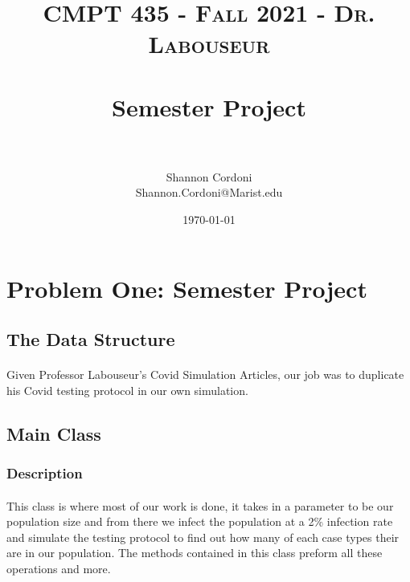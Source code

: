 \documentclass[letterpaper, 10pt,DIV=13]{scrartcl}
\title{	
   \normalfont \normalsize 
   \textsc{CMPT 435 - Fall 2021 - Dr. Labouseur} \\[10pt] %
   \horrule{0.5pt} \\[0.25cm] 	%
   \huge Semester Project  \\     	    %
   \horrule{0.5pt} \\[0.25cm] 	%
}
\author{Shannon Cordoni \\ \normalsize Shannon.Cordoni@Marist.edu}
\date{\normalsize\today} 	%
\numberwithin{equation}{section} %
\numberwithin{figure}{section} %
\numberwithin{table}{section} %
\begin{document}
\maketitle %

\section{Problem One: Semester Project}

\subsection{The Data Structure}
\paragraph{} Given Professor Labouseur's Covid Simulation Articles, our job was to duplicate his Covid testing protocol in our own simulation. \\


\subsection{Main Class}

\subsubsection{Description}
\paragraph{}This class is where most of our work is done, it takes in a parameter to be our population size and from there we infect the population at a 2\% infection rate and simulate the testing protocol to find out how many of each case types their are in our population. The methods contained in this class preform all these operations and more. 
\end{document}
